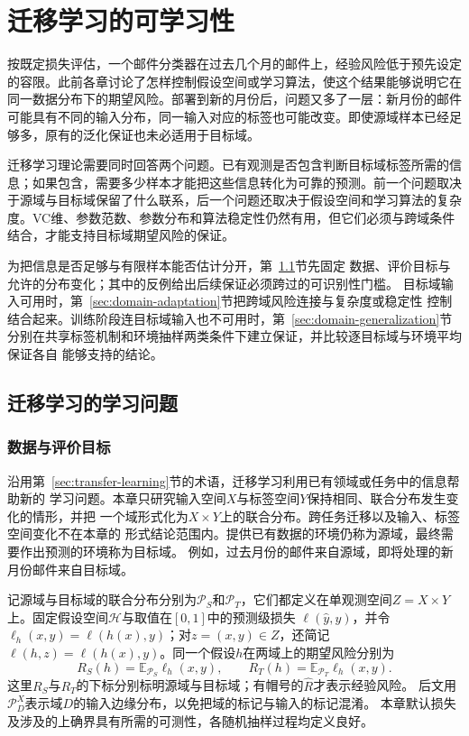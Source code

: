 \chapter{迁移学习的可学习性}
\label{chap:transfer-learning-theory}

按既定损失评估，一个邮件分类器在过去几个月的邮件上，经验风险低于预先设定的容限。此前各章讨论了怎样控制假设空间或学习算法，使这个结果能够说明它在同一数据分布下的期望风险。部署到新的月份后，问题又多了一层：新月份的邮件可能具有不同的输入分布，同一输入对应的标签也可能改变。即使源域样本已经足够多，原有的泛化保证也未必适用于目标域。

迁移学习理论需要同时回答两个问题。已有观测是否包含判断目标域标签所需的信息；如果包含，需要多少样本才能把这些信息转化为可靠的预测。前一个问题取决于源域与目标域保留了什么联系，后一个问题还取决于假设空间和学习算法的复杂度。VC维、参数范数、参数分布和算法稳定性仍然有用，但它们必须与跨域条件结合，才能支持目标域期望风险的保证。

为把信息是否足够与有限样本能否估计分开，第~\ref{sec:transfer-learning-setting}节先固定
数据、评价目标与允许的分布变化；其中的反例给出后续保证必须跨过的可识别性门槛。
目标域输入可用时，第~\ref{sec:domain-adaptation}节把跨域风险连接与复杂度或稳定性
控制结合起来。训练阶段连目标域输入也不可用时，第~\ref{sec:domain-generalization}节
分别在共享标签机制和环境抽样两类条件下建立保证，并比较逐目标域与环境平均保证各自
能够支持的结论。

\section{迁移学习的学习问题}
\label{sec:transfer-learning-setting}

\subsection{数据与评价目标}
\label{sec:adaptation-generalization-settings}

沿用第~\ref{sec:transfer-learning}节的术语，迁移学习利用已有领域或任务中的信息帮助新的
学习问题。本章只研究输入空间$X$与标签空间$Y$保持相同、联合分布发生变化的情形，并把
一个域形式化为$X\times Y$上的联合分布。跨任务迁移以及输入、标签空间变化不在本章的
形式结论范围内。提供已有数据的环境仍称为源域，最终需要作出预测的环境称为目标域。
例如，过去月份的邮件来自源域，即将处理的新月份邮件来自目标域。

记源域与目标域的联合分布分别为$\mathcal P_S$和$\mathcal P_T$，它们都定义在单观测空间$Z=X\times Y$上。固定假设空间$\mathcal H$与取值在$[0,1]$中的预测级损失
$\ell(\widehat y,y)$，并令
$\ell_h(x,y)=\ell(h(x),y)$；对$z=(x,y)\in Z$，还简记$\ell(h,z)=\ell(h(x),y)$。同一个假设$h$在两域上的期望风险分别为
\begin{equation}
 R_S(h)=\mathbb E_{\mathcal P_S}\ell_h(x,y),\qquad
 R_T(h)=\mathbb E_{\mathcal P_T}\ell_h(x,y).
 \label{eq:transfer-population-risks}
\end{equation}
这里$R_S$与$R_T$的下标分别标明源域与目标域；有帽号的$\hat R$才表示经验风险。
后文用$\mathcal P_D^X$表示域$D$的输入边缘分布，以免把域的标记与输入的标记混淆。
本章默认损失及涉及的上确界具有所需的可测性，各随机抽样过程均定义良好。

